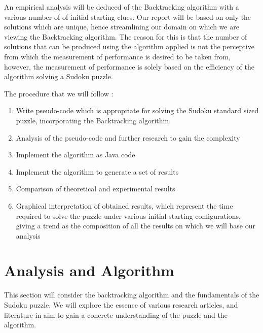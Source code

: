 \documentclass[12pt]{article}
\begin{document}
\begin{flushleft}
An empirical analysis will be deduced of the Backtracking algorithm with a various number of of initial starting clues. Our report will be based on only the solutions which are unique, hence streamlining our domain on which we are viewing the Backtracking algorithm. The reason for this is that the number of solutions that can be produced using the algorithm applied is not the perceptive from which the measurement of performance is desired to be taken from, however, the measurement of performance is solely based on the efficiency of the algorithm solving a Sudoku puzzle. 
\end{flushleft}

\begin{flushleft}
The procedure that we will follow : 
\begin{enumerate}
\item Write pseudo-code which is appropriate for solving the Sudoku standard sized puzzle, incorporating the Backtracking algorithm.
\item Analysis of the pseudo-code and further research to gain the complexity
\item Implement the algorithm as Java code 
\item Implement the algorithm to generate a set of results
\item Comparison of theoretical and experimental results
\item Graphical interpretation of obtained results, which represent the time required to solve the puzzle under various initial starting configurations, giving a trend as the composition of all the results on which we will base our analysis 
\end{enumerate}
\end{flushleft}



\section{Analysis and Algorithm}
This section will consider the backtracking algorithm and the fundamentals of the Sudoku puzzle. We will explore the essence of various research articles, and literature in aim to gain a concrete understanding of the puzzle and the algorithm. 
\end{document}
